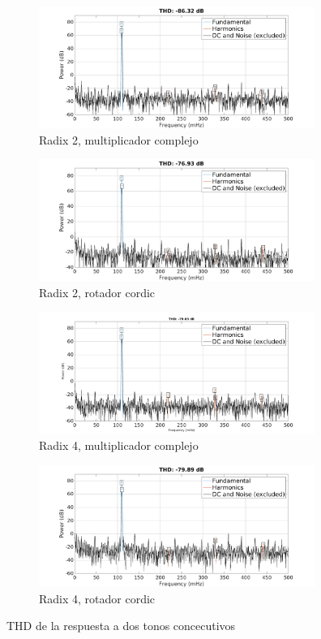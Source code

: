 \begin{figure}[htbp!]
        \advance\leftskip-1.5cm
        \begin{subfigure}{0.6\textwidth}%
        \includegraphics[width=9cm]{./figures/thd_r2_4096_16_mul_450_451.png}
        \caption{Radix 2, multiplicador complejo}
        \end{subfigure} 
        \begin{subfigure}{0.6\textwidth}%
        \includegraphics[width=9cm]{./figures/thd_r2_4096_16_cor_450_451.png}
        \caption{Radix 2, rotador cordic}
        \end{subfigure} 
        \begin{subfigure}{0.6\textwidth}%
        \includegraphics[width=9cm]{./figures/thd_r4_4096_16_mul_450_451.png}
        \caption{Radix 4, multiplicador complejo}
        \end{subfigure}
        \begin{subfigure}{0.6\textwidth}%
        \includegraphics[width=9cm]{./figures/thd_r4_4096_16_cor_450_451.png}
        \caption{Radix 4, rotador cordic}
        \end{subfigure}
        \caption{THD de la respuesta a dos tonos concecutivos}
        \label{fig:two_delta}
\end{figure}

